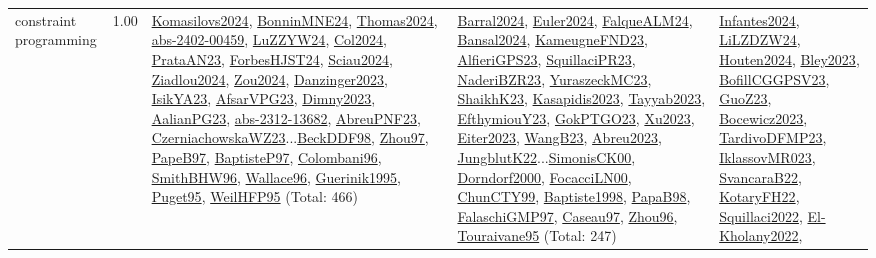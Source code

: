 {\begin{longtable}{p{3cm}r>{\raggedright\arraybackslash}p{6cm}>{\raggedright\arraybackslash}p{6cm}>{\raggedright\arraybackslash}p{8cm}}
\index{constraint programming}\index{CP!constraint programming}constraint programming &  1.00 & \hyperref[detail:Komasilovs2024]{Komasilovs2024}, \hyperref[detail:BonninMNE24]{BonninMNE24}, \hyperref[detail:Thomas2024]{Thomas2024}, \hyperref[detail:abs-2402-00459]{abs-2402-00459}, \hyperref[detail:LuZZYW24]{LuZZYW24}, \hyperref[detail:Col2024]{Col2024}, \hyperref[detail:PrataAN23]{PrataAN23}, \hyperref[detail:ForbesHJST24]{ForbesHJST24}, \hyperref[detail:Sciau2024]{Sciau2024}, \hyperref[detail:Ziadlou2024]{Ziadlou2024}, \hyperref[detail:Zou2024]{Zou2024}, \hyperref[detail:Danzinger2023]{Danzinger2023}, \hyperref[detail:IsikYA23]{IsikYA23}, \hyperref[detail:AfsarVPG23]{AfsarVPG23}, \hyperref[detail:Dimny2023]{Dimny2023}, \hyperref[detail:AalianPG23]{AalianPG23}, \hyperref[detail:abs-2312-13682]{abs-2312-13682}, \hyperref[detail:AbreuPNF23]{AbreuPNF23}, \hyperref[detail:CzerniachowskaWZ23]{CzerniachowskaWZ23}...\hyperref[detail:BeckDDF98]{BeckDDF98}, \hyperref[detail:Zhou97]{Zhou97}, \hyperref[detail:PapeB97]{PapeB97}, \hyperref[detail:BaptisteP97]{BaptisteP97}, \hyperref[detail:Colombani96]{Colombani96}, \hyperref[detail:SmithBHW96]{SmithBHW96}, \hyperref[detail:Wallace96]{Wallace96}, \hyperref[detail:Guerinik1995]{Guerinik1995}, \hyperref[detail:Puget95]{Puget95}, \hyperref[detail:WeilHFP95]{WeilHFP95} (Total: 466) & \hyperref[detail:Barral2024]{Barral2024}, \hyperref[detail:Euler2024]{Euler2024}, \hyperref[detail:FalqueALM24]{FalqueALM24}, \hyperref[detail:Bansal2024]{Bansal2024}, \hyperref[detail:KameugneFND23]{KameugneFND23}, \hyperref[detail:AlfieriGPS23]{AlfieriGPS23}, \hyperref[detail:SquillaciPR23]{SquillaciPR23}, \hyperref[detail:NaderiBZR23]{NaderiBZR23}, \hyperref[detail:YuraszeckMC23]{YuraszeckMC23}, \hyperref[detail:ShaikhK23]{ShaikhK23}, \hyperref[detail:Kasapidis2023]{Kasapidis2023}, \hyperref[detail:Tayyab2023]{Tayyab2023}, \hyperref[detail:EfthymiouY23]{EfthymiouY23}, \hyperref[detail:GokPTGO23]{GokPTGO23}, \hyperref[detail:Xu2023]{Xu2023}, \hyperref[detail:Eiter2023]{Eiter2023}, \hyperref[detail:WangB23]{WangB23}, \hyperref[detail:Abreu2023]{Abreu2023}, \hyperref[detail:JungblutK22]{JungblutK22}...\hyperref[detail:SimonisCK00]{SimonisCK00}, \hyperref[detail:Dorndorf2000]{Dorndorf2000}, \hyperref[detail:FocacciLN00]{FocacciLN00}, \hyperref[detail:ChunCTY99]{ChunCTY99}, \hyperref[detail:Baptiste1998]{Baptiste1998}, \hyperref[detail:PapaB98]{PapaB98}, \hyperref[detail:FalaschiGMP97]{FalaschiGMP97}, \hyperref[detail:Caseau97]{Caseau97}, \hyperref[detail:Zhou96]{Zhou96}, \hyperref[detail:Touraivane95]{Touraivane95} (Total: 247) & \hyperref[detail:Infantes2024]{Infantes2024}, \hyperref[detail:LiLZDZW24]{LiLZDZW24}, \hyperref[detail:Houten2024]{Houten2024}, \hyperref[detail:Bley2023]{Bley2023}, \hyperref[detail:BofillCGGPSV23]{BofillCGGPSV23}, \hyperref[detail:GuoZ23]{GuoZ23}, \hyperref[detail:Bocewicz2023]{Bocewicz2023}, \hyperref[detail:TardivoDFMP23]{TardivoDFMP23}, \hyperref[detail:IklassovMR023]{IklassovMR023}, \hyperref[detail:SvancaraB22]{SvancaraB22}, \hyperref[detail:KotaryFH22]{KotaryFH22}, \hyperref[detail:Squillaci2022]{Squillaci2022}, \hyperref[detail:El-Kholany2022]{El-Kholany2022}, 
\end{longtable}}
